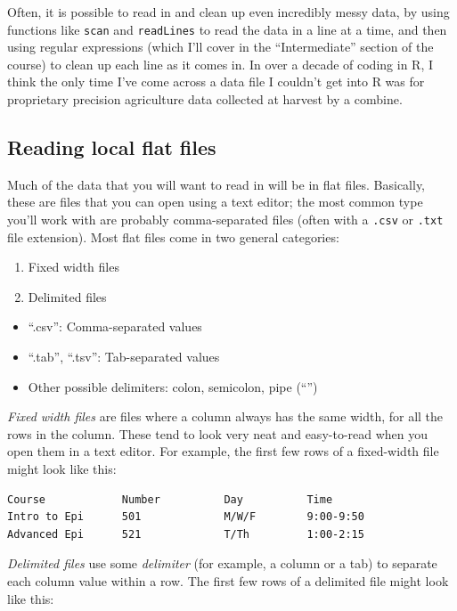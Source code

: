 \documentclass[]{book}
\providecommand{\tightlist}{%
  \setlength{\itemsep}{0pt}\setlength{\parskip}{0pt}}
\begin{document}
Often, it is possible to read in and clean up even incredibly messy
data, by using functions like \texttt{scan} and \texttt{readLines} to
read the data in a line at a time, and then using regular expressions
(which I'll cover in the ``Intermediate'' section of the course) to
clean up each line as it comes in. In over a decade of coding in R, I
think the only time I've come across a data file I couldn't get into R
was for proprietary precision agriculture data collected at harvest by a
combine.

\subsection{Reading local flat files}\label{reading-local-flat-files}

Much of the data that you will want to read in will be in flat files.
Basically, these are files that you can open using a text editor; the
most common type you'll work with are probably comma-separated files
(often with a \texttt{.csv} or \texttt{.txt} file extension). Most flat
files come in two general categories:

\begin{enumerate}
\def\labelenumi{\arabic{enumi}.}
\item
  Fixed width files
\item
  Delimited files
\end{enumerate}

\begin{itemize}
\tightlist
\item
  ``.csv'': Comma-separated values
\item
  ``.tab'', ``.tsv'': Tab-separated values
\item
  Other possible delimiters: colon, semicolon, pipe (``\textbar{}'')
\end{itemize}

\emph{Fixed width files} are files where a column always has the same
width, for all the rows in the column. These tend to look very neat and
easy-to-read when you open them in a text editor. For example, the first
few rows of a fixed-width file might look like this:

\begin{verbatim}
Course            Number          Day          Time
Intro to Epi      501             M/W/F        9:00-9:50
Advanced Epi      521             T/Th         1:00-2:15
\end{verbatim}

\emph{Delimited files} use some \emph{delimiter} (for example, a column
or a tab) to separate each column value within a row. The first few rows
of a delimited file might look like this:
\end{document}
